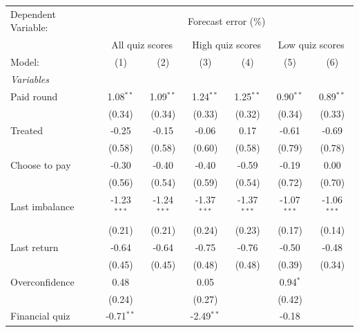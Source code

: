 \begingroup
\centering
\begin{tabular}{lcccccc}
   \tabularnewline \midrule \midrule
   Dependent Variable: & \multicolumn{6}{c}{Forecast error (\%)}\\
    & \multicolumn{2}{c}{All quiz scores} & \multicolumn{2}{c}{High quiz scores} & \multicolumn{2}{c}{Low quiz scores} \\ 
   Model:             & (1)           & (2)           & (3)           & (4)           & (5)           & (6)\\  
   \midrule
   \emph{Variables}\\
   Paid round         & 1.08$^{**}$   & 1.09$^{**}$   & 1.24$^{**}$   & 1.25$^{**}$   & 0.90$^{**}$   & 0.89$^{**}$\\   
                      & (0.34)        & (0.34)        & (0.33)        & (0.32)        & (0.34)        & (0.33)\\   
   Treated            & -0.25         & -0.15         & -0.06         & 0.17          & -0.61         & -0.69\\   
                      & (0.58)        & (0.58)        & (0.60)        & (0.58)        & (0.79)        & (0.78)\\   
   Choose to pay      & -0.30         & -0.40         & -0.40         & -0.59         & -0.19         & 0.00\\   
                      & (0.56)        & (0.54)        & (0.59)        & (0.54)        & (0.72)        & (0.70)\\   
   Last imbalance     & -1.23$^{***}$ & -1.24$^{***}$ & -1.37$^{***}$ & -1.37$^{***}$ & -1.07$^{***}$ & -1.06$^{***}$\\   
                      & (0.21)        & (0.21)        & (0.24)        & (0.23)        & (0.17)        & (0.14)\\   
   Last return        & -0.64         & -0.64         & -0.75         & -0.76         & -0.50         & -0.48\\   
                      & (0.45)        & (0.45)        & (0.48)        & (0.48)        & (0.39)        & (0.34)\\   
   Overconfidence     & 0.48          &               & 0.05          &               & 0.94$^{*}$    &   \\   
                      & (0.24)        &               & (0.27)        &               & (0.42)        &   \\   
   Financial quiz     & -0.71$^{**}$  &               & -2.49$^{**}$  &               & -0.18         &   \\   

\end{tabular}
